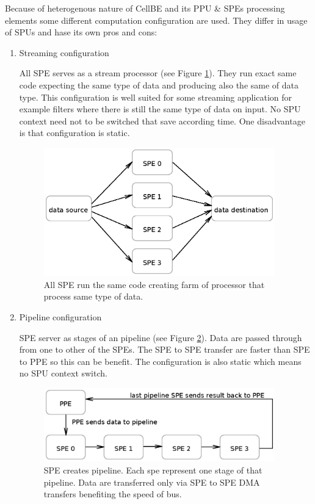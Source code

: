 \par
Because of heterogenous nature of CellBE and its PPU \& SPEs processing elements some different computation configuration are used. They differ in usage of SPUs and hase its own pros and cons:
\begin{enumerate}
\item Streaming configuration
\par
All SPE serves as a stream processor (see Figure \ref{fg:streamingModel}). They run exact same code expecting the same type of data and producing also the same of data type. This configuration is well suited for some streaming application for example filters where there is still the same type of data on input. No SPU context need not to be switched that save according time. One disadvantage is that configuration is static.

\begin{figure}
    \centering
    \includegraphics[width=10cm]{data/streamingModel.eps}
    \caption[Streaming SPE configuration]{All SPE run the same code creating farm of processor that process same type of data.}
    \label{fg:streamingModel}
\end{figure}

\item Pipeline configuration
\par
SPE server as stages of an pipeline (see Figure \ref{fg:pipelineModel}). Data are passed through from one to other of the SPEs. The SPE to SPE transfer are faster than SPE to PPE so this can be benefit. The configuration is also static which means no SPU context switch.

\begin{figure}
    \centering
    \includegraphics[width=10cm]{data/pipelineModel.eps}
    \caption[Pipeline SPE configuration]{SPE creates pipeline. Each spe represent one stage of that pipeline. Data are transferred only via SPE to SPE DMA transfers benefiting the speed of bus.}
    \label{fg:pipelineModel}
\end{figure}


\end{enumerate}
